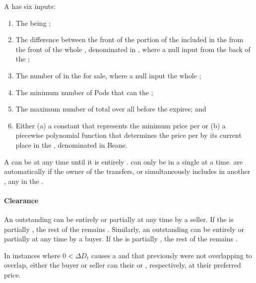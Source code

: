 \documentclass[class=article, crop=false]{standalone}
\begin{document}
A  has six inputs: 

\begin{enumerate}
    \item The  being ;
    \item The difference between the front of the portion of the  included in the  from the front of the whole , denominated in , where a null input  from the back of the ;
    \item The number of  in the  for sale, where a null input  the whole ;
    \item The minimum number of Pods that can  the ; 
    \item The maximum number of total   over all  before the  expires; and
    \item Either (a) a constant that represents the minimum price per  or (b) a piecewise polynomial function that determines the price per  by its current place in the , denominated in Beans.
\end{enumerate}

A  can be  at any time until it is entirely .  can only be  in a single  at a time.  are automatically  if the owner of the  transfers, or simultaneously includes in another , any  in the .

\paragraph{Clearance}

An outstanding  can be entirely or partially  at any time by a  seller. If the  is partially , the rest of the  remains . Similarly, an outstanding  can be entirely or partially  at any time by a  buyer. If the  is partially , the rest of the  remains .

In instances where $0 < \Delta D_t$ causes a  and  that previously were not overlapping to overlap, either the buyer or seller can  their  or , respectively, at their preferred price. 
\end{document}

